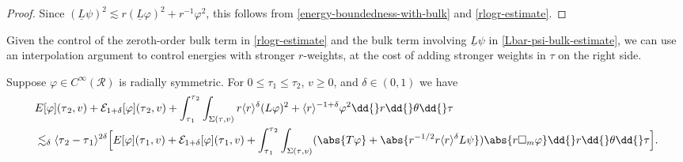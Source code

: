 \documentclass[10pt, reqno]{amsart}
\begin{document}
\begin{proof}
Since \((\underline{L}\psi{})^2\lesssim r(\underline{L}\varphi{})^2 + r^{-1}\varphi^2\), this follows from
\cref{energy-boundedness-with-bulk} and \cref{rlogr-estimate}.
\end{proof}
Given the control of the zeroth-order bulk term in \cref{rlogr-estimate} and the
bulk term involving \(\underline{L}\psi{}\) in \cref{Lbar-psi-bulk-estimate}, we
can use an interpolation argument to control energies with stronger
\(r\)-weights, at the cost of adding stronger weights in \(\tau{}\) on the right
side.
\begin{proposition}
Suppose \(\varphi{}\in C^\infty(\mathcal{R})\) is radially symmetric. For \(0\le \tau_1\le
\tau_2\), \(v\ge 0\), and \(\delta{}\in (0,1)\) we have
\begin{equation}\label{r1+delta-estimate-equation}
\begin{split}
&E[\varphi{}](\tau{}_2,v) + \mathcal{E}_{1+\delta}[\varphi{}](\tau{}_2,v) + \int_{\tau{}_1}^{\tau{}_2} \int _{\Sigma{}(\tau{},v)}r\langle{}r\rangle{}^\delta{}(L\varphi{})^2 + \langle{}r\rangle{}^{-1+\delta{}}\varphi{}^2\dd{}r\dd{}\theta{}\dd{}\tau{} \\
&\lesssim_\delta{} \langle{}\tau{}_2-\tau{}_1\rangle{}^{2\delta{}}\Bigl[E[\varphi{}](\tau{}_1,v) + \mathcal{E}_{1+\delta}[\varphi{}](\tau{}_1,v) + \int_{\tau{}_1}^{\tau{}_2} \int _{\Sigma{}(\tau{},v)} (\abs{T\varphi{}} +  \abs{r^{-1/2}r\langle{}r\rangle{}^\delta{}L\psi{}})\abs{r\Box{}_m\varphi{}} \dd{}r\dd{}\theta{}\dd{}\tau{}\Bigr].
\end{split}
\end{equation}
\label{r1+delta-estimate}
\end{proposition}
\end{document}
